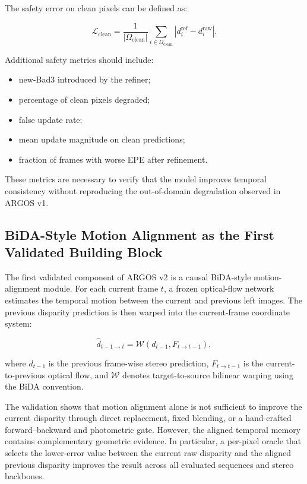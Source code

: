 \documentclass[11pt,a4paper]{article}
\begin{document}
The safety error on clean pixels can be defined as:

\begin{equation}
\mathcal{L}_{\mathrm{clean}}
=
\frac{1}
{
|\Omega_{\mathrm{clean}}|
}
\sum_{i \in \Omega_{\mathrm{clean}}}
\left|
d_i^{\mathrm{ref}}
-
d_i^{\mathrm{raw}}
\right|.
\end{equation}

Additional safety metrics should include:

\begin{itemize}
    \item new-Bad3 introduced by the refiner;
    \item percentage of clean pixels degraded;
    \item false update rate;
    \item mean update magnitude on clean predictions;
    \item fraction of frames with worse EPE after refinement.
\end{itemize}

These metrics are necessary to verify that the model improves temporal consistency without reproducing the out-of-domain degradation observed in ARGOS v1.

\subsection{BiDA-Style Motion Alignment as the First Validated Building Block}

The first validated component of ARGOS v2 is a causal BiDA-style motion-alignment module. 
For each current frame $t$, a frozen optical-flow network estimates the temporal motion between the current and previous left images. The previous disparity prediction is then warped into the current-frame coordinate system:

\[
\hat{d}_{t-1 \rightarrow t}
=
\mathcal{W}
\left(
d_{t-1},
F_{t \rightarrow t-1}
\right),
\]

where $d_{t-1}$ is the previous frame-wise stereo prediction, $F_{t \rightarrow t-1}$ is the current-to-previous optical flow, and $\mathcal{W}$ denotes target-to-source bilinear warping using the BiDA convention.

The validation shows that motion alignment alone is not sufficient to improve the current disparity through direct replacement, fixed blending, or a hand-crafted forward--backward and photometric gate. However, the aligned temporal memory contains complementary geometric evidence. In particular, a per-pixel oracle that selects the lower-error value between the current raw disparity and the aligned previous disparity improves the result across all evaluated sequences and stereo backbones.
\end{document}
